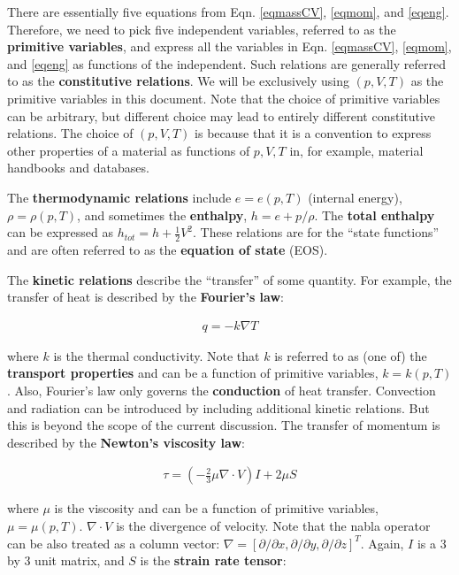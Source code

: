 \documentclass[12pt, letterpaper]{report}
\begin{document}
There are essentially five equations from Eqn. \ref{eqmassCV}, \ref{eqmom}, and \ref{eqeng}.
Therefore, we need to pick five independent variables, referred to as the {\bf primitive variables},
and express all the variables in Eqn.  \ref{eqmassCV}, \ref{eqmom}, and \ref{eqeng} as functions
of the independent. Such relations are generally referred to as the {\bf constitutive relations}. We
will be exclusively using $(p, V, T)$ as the primitive variables in this document. Note that the
choice of primitive variables can be arbitrary, but different choice may lead to entirely different
constitutive relations. The choice of $(p, V, T)$ is because that it is a convention to express
other properties of a material as functions of $p, V, T$ in, for example, material handbooks and
databases.
\paraspace

The {\bf thermodynamic relations} include $e = e(p, T)$ (internal energy), $\rho = \rho(p, T)$, and
sometimes the {\bf enthalpy}, $h = e + p/\rho$. The {\bf total enthalpy} can be expressed as
$h_{tot} = h + \tfrac{1}{2}V^2$. These relations are for the ``state functions'' and are often
referred to as the {\bf equation of state} (EOS).
\paraspace

The {\bf kinetic relations} describe the ``transfer'' of some quantity. For example, the transfer of
heat is described by the {\bf Fourier's law}:

\begin{align*}
   q = -k\nabla T
\end{align*}

where $k$ is the thermal conductivity. Note that $k$ is referred to as (one of) the {\bf transport
properties} and can be a function of primitive variables, $k = k(p,T)$. Also, Fourier's law only
governs the {\bf conduction} of heat transfer. Convection and radiation can be introduced by
including additional kinetic relations. But this is beyond the scope of the current discussion. The
transfer of momentum is described by the {\bf Newton's viscosity law}:

\begin{align*}
   \tau = \left(-\frac{2}{3}\mu \nabla \cdot V\right) I + 2 \mu S
\end{align*}

where $\mu$ is the viscosity and can be a function of primitive variables, $\mu = \mu(p, T)$.
$\nabla \cdot V$ is the divergence of velocity. Note that the nabla operator can be also treated as
a column vector: $\nabla = [\partial/\partial x, \partial/\partial y, \partial/\partial z]^T$.
Again, $I$ is a 3 by 3 unit matrix, and $S$ is the {\bf strain rate tensor}:
\end{document}
